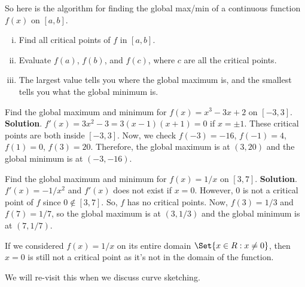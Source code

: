 So here is the algorithm for finding the global max/min
of a continuous function $ f(x) $ on $ [a,b] $.
\begin{enumerate}[(i)]
    \item Find all critical points of $ f $ in $ [a,b] $.
    \item Evaluate $ f(a) $, $ f(b) $, and $ f(c) $, where $ c $ are all the critical points.
    \item The largest value tells you where the global maximum is, and the smallest tells you what the global minimum is.
\end{enumerate}
\begin{Example}{}{}
    Find the global maximum and minimum for $ f(x)=x^3-3x+2 $ on $ [-3,3] $.
    \tcblower{}
    \textbf{Solution}. $ f'(x)=3x^2-3=3(x-1)(x+1)=0 $ if $ x=\pm 1 $.
    These critical points are both inside $ [-3,3] $. Now, we check
    $ f(-3)=-16 $, $ f(-1)=4 $, $ f(1)=0 $, $ f(3)=20 $. Therefore, the global maximum is at $ (3,20) $ and
    the global minimum is at $ (-3,-16) $.
\end{Example}
\begin{Example}{}{}
    Find the global maximum and minimum for $ f(x)=1/x $ on $ [3,7] $.
    \tcblower{}
    \textbf{Solution}. $ f'(x)=-1/x^2 $ and $ f'(x) $ does not exist if $ x=0 $.
    However, $ 0 $ is not a critical point of $ f $ since $ 0\notin [3,7] $.
    So, $ f $ has no critical points. Now, $ f(3)=1/3 $ and $ f(7)=1/7 $, so
    the global maximum is at $ (3,1/3) $ and the global minimum is at $ (7,1/7) $.

    \begin{Remark}{}{}
        If we considered $ f(x)=1/x $ on its entire domain $ \Set{x\in\R:x\ne 0} $, then
        $ x=0 $ is still not a critical point as it's not in the domain of the function.
    \end{Remark}
\end{Example}
We will re-visit this when we discuss curve sketching.

